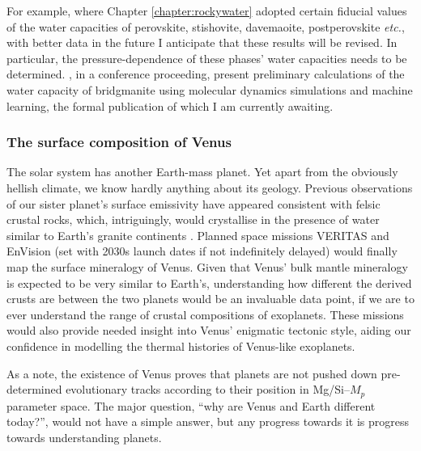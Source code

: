 For example, where Chapter \ref{chapter:rockywater} adopted certain fiducial values of the water capacities of perovskite, stishovite, davemaoite, postperovskite \textit{etc.}, with better data in the future I anticipate that these results will be revised. In particular, the pressure-dependence of these phases' water capacities needs to be determined. \citet{deng_water_2022}, in a conference proceeding, present preliminary calculations of the water capacity of bridgmanite using molecular dynamics simulations and machine learning, the formal publication of which I am currently awaiting.








\subsubsection{The surface composition of Venus}

The solar system has another Earth-mass planet. Yet apart from the obviously hellish climate, we know hardly anything about its geology. Previous observations of our sister planet's surface emissivity have appeared consistent with felsic crustal rocks, which, intriguingly, would crystallise in the presence of water similar to Earth's granite continents \citep{hashimoto_felsic_2008}. Planned space missions VERITAS and EnVision (set with 2030s launch dates if not indefinitely delayed) would finally map the surface mineralogy of Venus. Given that Venus' bulk mantle mineralogy is expected to be very similar to Earth's, understanding how different the derived crusts are between the two planets would be an invaluable data point, if we are to ever understand the range of crustal compositions of exoplanets. These missions would also provide needed insight into Venus' enigmatic tectonic style, aiding our confidence in modelling the thermal histories of Venus-like exoplanets. 

As a note, the existence of Venus proves that planets are not pushed down pre-determined evolutionary tracks according to their position in Mg/Si--$M_p$ parameter space. The major question, ``why are Venus and Earth different today?'', would not have a simple answer, but any progress towards it is progress towards understanding planets.


